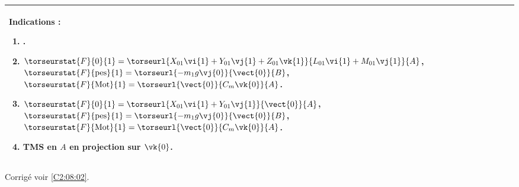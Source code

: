 \ifprof
\else
\ifcolle
\else
\footnotesize
\begin{center}
\begin{tabular}{|p{.9\linewidth}|}
\hline
Indications :
\begin{enumerate}
\item .
\item $\torseurstat{F}{0}{1}=\torseurl{X_{01}\vi{1}+Y_{01}\vj{1}+Z_{01}\vk{1}}{L_{01}\vi{1}+M_{01}\vj{1}}{A}$,
$\torseurstat{F}{\text{pes}}{1}=\torseurl{-m_1g\vj{0}}{\vect{0}}{B}$,
$\torseurstat{F}{\text{Mot}}{1}=\torseurl{\vect{0}}{C_m\vk{0}}{A}$.
\item $\torseurstat{F}{0}{1}=\torseurl{X_{01}\vi{1}+Y_{01}\vj{1}}{\vect{0}}{A}$,
$\torseurstat{F}{\text{pes}}{1}=\torseurl{-m_1g\vj{0}}{\vect{0}}{B}$,
$\torseurstat{F}{\text{Mot}}{1}=\torseurl{\vect{0}}{C_m\vk{0}}{A}$.
\item TMS en $A$ en projection sur $\vk{0}$.
\end{enumerate} \\ \hline
\end{tabular}
\end{center}
\normalsize
\fi
\begin{flushright}
\footnotesize{Corrigé  voir \ref{C2:08:02}.}
\end{flushright}%
\fi